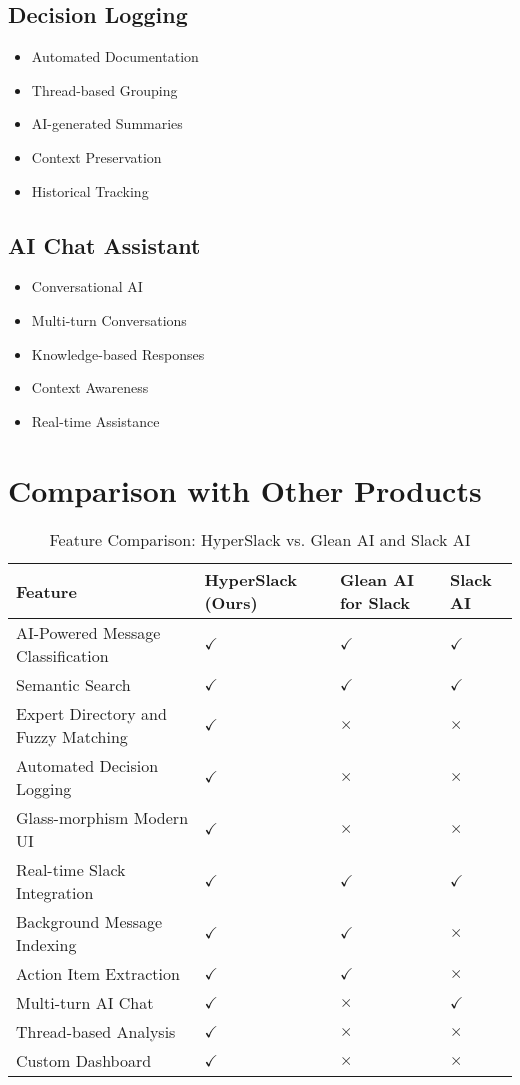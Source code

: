 \documentclass[12pt,a4paper]{article}
\begin{document}
\subsection{Decision Logging}
\begin{itemize}
    \item Automated Documentation
    \item Thread-based Grouping
    \item AI-generated Summaries
    \item Context Preservation
    \item Historical Tracking
\end{itemize}
\subsection{AI Chat Assistant}
\begin{itemize}
    \item Conversational AI
    \item Multi-turn Conversations
    \item Knowledge-based Responses
    \item Context Awareness
    \item Real-time Assistance
\end{itemize}
\section{Comparison with Other Products}
\begin{table}[h!]
\centering
\begin{tabular}{|p{4cm}|p{3cm}|p{3cm}|p{3cm}|}
\hline
\textbf{Feature} & \textbf{HyperSlack (Ours)} & \textbf{Glean AI for Slack} & \textbf{Slack AI} \\
\hline
AI-Powered Message Classification & $\checkmark$ & $\checkmark$ & $\checkmark$ \\
\hline
Semantic Search & $\checkmark$ & $\checkmark$ & $\checkmark$ \\
\hline
Expert Directory and Fuzzy Matching & $\checkmark$ & $\times$ & $\times$ \\
\hline
Automated Decision Logging & $\checkmark$ & $\times$ & $\times$ \\
\hline
Glass-morphism Modern UI & $\checkmark$ & $\times$ & $\times$ \\
\hline
Real-time Slack Integration & $\checkmark$ & $\checkmark$ & $\checkmark$ \\
\hline
Background Message Indexing & $\checkmark$ & $\checkmark$ & $\times$ \\
\hline
Action Item Extraction & $\checkmark$ & $\checkmark$ & $\times$ \\
\hline
Multi-turn AI Chat & $\checkmark$ & $\times$ & $\checkmark$ \\
\hline
Thread-based Analysis & $\checkmark$ & $\times$ & $\times$ \\
\hline
Custom Dashboard & $\checkmark$ & $\times$ & $\times$ \\
\hline
\end{tabular}
\caption{Feature Comparison: HyperSlack vs. Glean AI and Slack AI}
\end{table}
\end{document}
